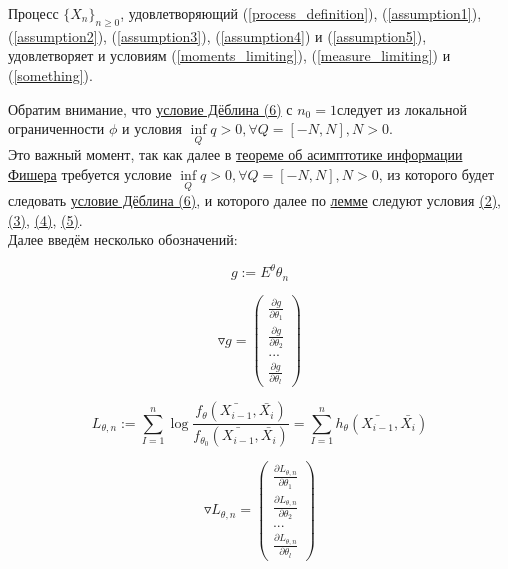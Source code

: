 	

	
\begin{Lemma} \label{VeretennikovLemma1}
	Процесс $\{X_n\}_{n \geqslant 0}$, удовлетворяющий (\ref{process_definition}), (\ref{assumption1}), (\ref{assumption2}), (\ref{assumption3}), (\ref{assumption4}) и (\ref{assumption5}), удовлетворяет и условиям (\ref{moments_limiting}), (\ref{measure_limiting}) и (\ref{something}).
\end{Lemma}

	Обратим внимание, что \hyperref[Deblin]{условие Дёблина (6)} с $n_0 = 1$следует из локальной ограниченности $\phi$ и условия $\inf\limits_{Q} q>0, \forall Q=[-N, N], N>0$.
	\\
	Это важный момент, так как далее в \hyperref[FisherInformationAsimptotic]{теореме об асимптотике информации Фишера} требуется условие $\inf\limits_{Q} q>0, \forall Q=[-N, N], N>0$,  из которого будет следовать \hyperref[Deblin]{условие Дёблина (6)}, и которого далее по \hyperref[VeretennikovLemma1]{лемме} следуют условия \hyperref[usl2]{(2)}, \hyperref[usl3]{(3)}, \hyperref[usl4]{(4)}, \hyperref[usl5]{(5)}.
	\\
	Далее введём несколько обозначений: %
	
	$$
	g := E^{\theta}\theta_n
	$$
	
	$$
	\triangledown g = \left(\begin{array}{ccc} \frac{\partial g}{\partial \theta_1} \\ \frac{\partial g}{\partial \theta_2} \\ ... \\ \frac{\partial g}{\partial \theta_l} \end{array}\right)
	$$
	
	$$
	L_{\theta, n} := \sum_{I=1}^{n} \log \frac{f_{\theta}\left(\bar{X_{i-1}}, \bar{X_i}\right)}{f_{\theta_0}\left(\bar{X_{i-1}}, \bar{X_i}\right)} = \sum_{I=1}^{n} h_{\theta}\left(\bar{X_{i-1}}, \bar{X_i}\right)
	$$
	
	$$
	\triangledown L_{\theta, n} = \left(\begin{array}{ccc} \frac{\partial L_{\theta, n}}{\partial \theta_1} \\ \frac{\partial L_{\theta, n}}{\partial \theta_2} \\ ... \\ \frac{\partial L_{\theta, n}}{\partial \theta_l} \end{array}\right)
	$$
	
